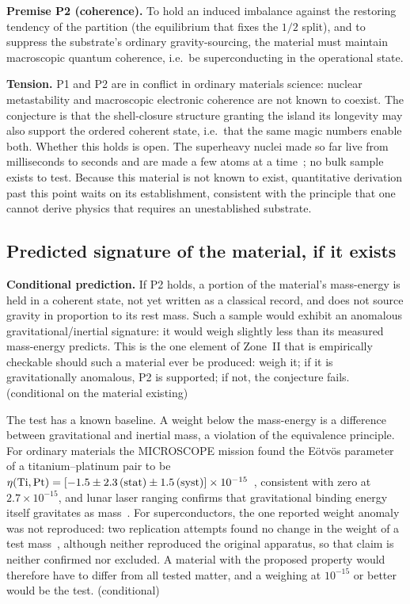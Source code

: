 \textbf{Premise P2 (coherence).} To hold an induced imbalance against the restoring tendency of the partition (the equilibrium that fixes the $1/2$
split), and to suppress the substrate's ordinary gravity-sourcing, the material must maintain macroscopic quantum coherence, i.e.\ be superconducting
in the operational state. \conjecture

\textbf{Tension.} P1 and P2 are in conflict in ordinary materials science: nuclear metastability and macroscopic electronic coherence are not known to
coexist. The conjecture is that the shell-closure structure granting the island its longevity may also support the ordered coherent state, i.e.\ that
the same magic numbers enable both. Whether this holds is open. \conjecture{} The superheavy nuclei made so far live from milliseconds to
seconds and are made a few atoms at a time~\cite{Oganessian2015}; no bulk sample exists to test. \observed{} Because this material is not known to exist, quantitative derivation past this point waits on its establishment, consistent with the principle that one cannot derive physics that requires an unestablished substrate.

\subsection{Predicted signature of the material, if it exists}
\textbf{Conditional prediction.} If P2 holds, a portion of the material's mass-energy is held in a coherent state, not yet written as a classical
record, and does not source gravity in proportion to its rest mass. Such a sample would exhibit an anomalous gravitational/inertial signature: it would
weigh slightly less than its measured mass-energy predicts. This is the one element of Zone~II that is empirically checkable should such a material
ever be produced: weigh it; if it is gravitationally anomalous, P2 is supported; if not, the conjecture fails. \prediction{} (conditional on the
material existing)

The test has a known baseline. A weight below the mass-energy is a difference between gravitational and inertial mass, a violation of the equivalence
principle. For ordinary materials the MICROSCOPE mission found the E\"otv\"os parameter of a titanium--platinum pair to be
$\eta({\rm Ti,Pt})=[-1.5\pm2.3\,({\rm stat})\pm1.5\,({\rm syst})]\times10^{-15}$~\cite{Touboul2022}, consistent with zero at $2.7\times10^{-15}$, and
lunar laser ranging confirms that gravitational binding energy itself gravitates as mass~\cite{Williams2004}. \observed{} For superconductors, the one
reported weight anomaly~\cite{Podkletnov1992} was not reproduced: two replication attempts found no change in the weight of a test
mass~\cite{Woods2001,Hathaway2003}, although neither reproduced the original apparatus, so that claim is neither confirmed nor excluded. \observed{} A
material with the proposed property would therefore have to differ from all tested matter, and a weighing at $10^{-15}$ or better would be the test.
\prediction{} (conditional)

